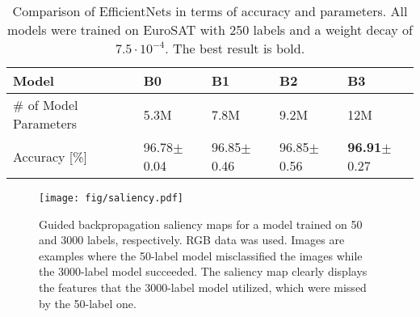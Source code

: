 \documentclass[journal]{IEEEtran}
\newcommand{\bt}[1]{\textbf{#1}}
\begin{document}
\begin{table}
\caption{Comparison of EfficientNets in terms of accuracy and parameters. All models were trained on EuroSAT with 250 labels and a weight decay of $7.5 \cdot 10^{-4}$. The best result is bold.}
\begin{center}
 {\tabulinesep=0.8mm
\setlength\tabcolsep{2pt}
\begin{tabu} { |X[2m]|| X[1cm] | X[1cm] | X[1cm]| X[1cm] |}
 \hline
  Model & B0 & B1 & B2 & B3 \\ \hline
  \# of Model Parameters & 5.3M & 7.8M & 9.2M & 12M \\ \hline
  Accuracy [\%] & 96.78$\pm$0.04  & 96.85$\pm$0.46 & 96.85$\pm$0.56 & \bt{96.91}$\pm$0.27 \\ \hline
\end{tabu}}
\label{table:model}
\end{center}
\end{table}


\begin{figure}[ht]
\centering
\texttt{[image: fig/saliency.pdf]}
\caption{Guided backpropagation saliency maps for a model trained on 50 and 3000 labels, respectively. RGB data was used. Images are examples where the 50-label model misclassified the images while the 3000-label model succeeded. The saliency map clearly displays the features that the 3000-label model utilized, which were missed by the 50-label one.}
\label{fig: saliency}
\end{figure}
\end{document}
